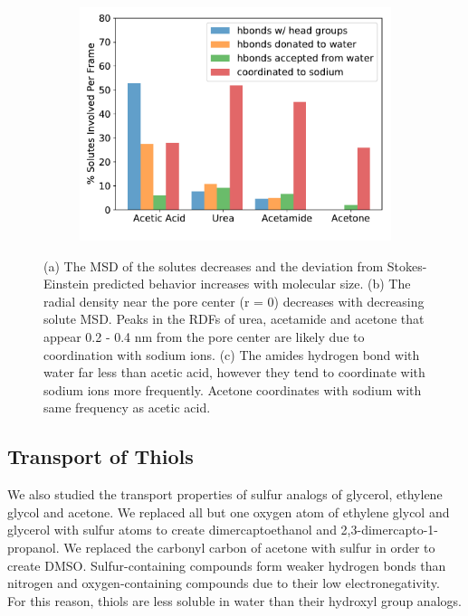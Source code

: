 \documentclass[journal=jpcbfk,manuscript=article]{achemso}
\begin{document}
\begin{figure}[!htb]
\begin{subfigure}{0.325\textwidth}
  \includegraphics[width=\textwidth]{ketone_hbonds.pdf}  %
  \caption{}\label{fig:ketone_hbonds}
  \end{subfigure}
  \caption{(a) The MSD of the solutes decreases and the deviation from
  Stokes-Einstein predicted behavior increases with molecular size.
  (b) The radial density near the pore center (r = 0) decreases with decreasing
  solute MSD. Peaks in the RDFs of urea, acetamide and acetone that appear 
  0.2 - 0.4 nm from the pore center are likely due to coordination with sodium
  ions. (c) The amides hydrogen bond with water far less than acetic acid, 
  however they tend to coordinate with sodium ions more frequently. Acetone
  coordinates with sodium with same frequency as acetic acid.}\label{fig:ketones}
  \end{figure}
  
  \subsection{Transport of Thiols}
  
  We also studied the transport properties of sulfur analogs of glycerol,
  ethylene glycol and acetone. We replaced all but one oxygen atom of 
  ethylene glycol and glycerol with sulfur atoms to create dimercaptoethanol
  and 2,3-dimercapto-1-propanol. We replaced the carbonyl carbon of acetone
  with sulfur in order to create DMSO. Sulfur-containing compounds form weaker
  hydrogen bonds than nitrogen and oxygen-containing compounds due to their
  low electronegativity.~\cite{biswal_hydrogen_2015} For this reason, thiols
  are less soluble in water than their hydroxyl group analogs.
  
\end{document}
